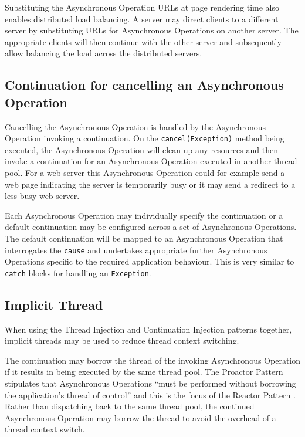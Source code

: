 \documentclass[prodmode]{style/acmlarge}
\begin{document}
Substituting the Asynchronous Operation URLs at page rendering time also enables
distributed load balancing.  A server may direct clients to a different server
by substituting URLs for Asynchronous Operations on another server. The
appropriate clients will then continue with the other server and subsequently
allow balancing the load across the distributed servers.


\subsection{Continuation for cancelling an Asynchronous Operation}

Cancelling the Asynchronous Operation is handled by the Asynchronous Operation
invoking a continuation.  On the \texttt{cancel(Exception)} method being
executed, the Asynchronous Operation will clean up any resources and then invoke
a continuation for an Asynchronous Operation executed in another thread
pool.  For a web server this Asynchronous Operation could for example
send a web page indicating the server is temporarily busy or it may send a
redirect to a less busy web server.

Each Asynchronous Operation may individually specify the continuation or a
default continuation may be configured across a set of Asynchronous Operations.
The default continuation will be mapped to an Asynchronous Operation that
interrogates the \texttt{cause} and undertakes appropriate further Asynchronous
Operations specific to the required application behaviour.  This is very similar
to \texttt{catch} blocks for handling an \texttt{Exception}.


\subsection{Implicit Thread}

When using the Thread Injection and Continuation Injection patterns together,
implicit threads may be used to reduce thread context switching.

The continuation may borrow the thread of the invoking Asynchronous Operation if
it results in being executed by the same thread pool.  The Proactor Pattern
stipulates that Asynchronous Operations ``must be performed without borrowing
the application's thread of control'' \cite[p. 8]{proactor} and this is the
focus of the Reactor Pattern \cite{reactor}.  Rather than dispatching back to
the same thread pool, the continued Asynchronous Operation may borrow the thread
to avoid the overhead of a thread context switch.
\end{document}
